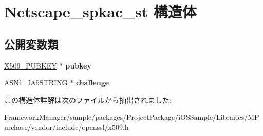 \hypertarget{struct_netscape__spkac__st}{}\section{Netscape\+\_\+spkac\+\_\+st 構造体}
\label{struct_netscape__spkac__st}
\subsection*{公開変数類}
\begin{DoxyCompactItemize}
\item 
\hypertarget{struct_netscape__spkac__st_ae1285ccf2bfbc84f2d57085f39a9bcd2}{}\hyperlink{struct_x509__pubkey__st}{X509\+\_\+\+P\+U\+B\+K\+E\+Y} $\ast$ {\bfseries pubkey}\label{struct_netscape__spkac__st_ae1285ccf2bfbc84f2d57085f39a9bcd2}

\item 
\hypertarget{struct_netscape__spkac__st_a7d21d91f0b8eab8b5fca8d3adef478ba}{}\hyperlink{structasn1__string__st}{A\+S\+N1\+\_\+\+I\+A5\+S\+T\+R\+I\+N\+G} $\ast$ {\bfseries challenge}\label{struct_netscape__spkac__st_a7d21d91f0b8eab8b5fca8d3adef478ba}

\end{DoxyCompactItemize}


この構造体詳解は次のファイルから抽出されました\+:\begin{DoxyCompactItemize}
\item 
Framework\+Manager/sample/packages/\+Project\+Package/i\+O\+S\+Sample/\+Libraries/\+M\+Purchase/vendor/include/openssl/x509.\+h\end{DoxyCompactItemize}
